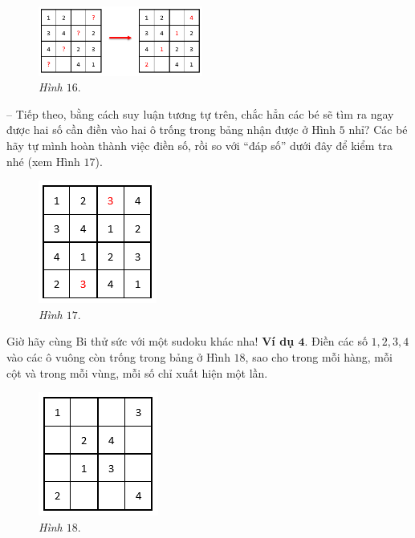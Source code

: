	\begin{multicols}{2}
		\begin{figure}[H]
			\centering
			\vspace*{5pt}
			\captionsetup{labelformat= empty, justification=centering}
			\includegraphics[width=0.48\textwidth]{pic5}
			\caption{\small\textit{Hình $16.$}}
			\vspace*{-10pt}
		\end{figure}
		-- Tiếp theo, bằng cách suy luận tương tự trên, chắc hẳn các bé sẽ tìm ra ngay được hai số cần điền vào hai ô trống trong bảng nhận được ở Hình $5$ nhỉ? Các bé hãy tự mình hoàn thành việc điền số, rồi so với “đáp số” dưới đây để kiểm tra nhé (xem Hình $17$).
		\begin{figure}[H]
			\centering
			\vspace*{-10pt}
			\captionsetup{labelformat= empty, justification=centering}
			\includegraphics[scale=1]{pic6}
			\caption{\small\textit{Hình $17.$}}
			\vspace*{-5pt}
		\end{figure}
	\end{multicols}
	Giờ hãy cùng Bi thử sức với một sudoku  khác nha!
	\vskip 0.1cm
		\textbf{Ví dụ $\pmb{4.}$} Điền các số $1, 2, 3, 4$ vào các ô vuông còn trống trong bảng ở Hình $18$, sao cho trong mỗi hàng, mỗi cột và trong mỗi vùng, mỗi số chỉ xuất hiện một lần.
		\vskip 0.1cm
		\begin{figure}
			\centering
			\vspace*{-35pt}
			\captionsetup{labelformat= empty, justification=centering}
			\includegraphics[scale=0.9]{pic7}
			\caption{\small\textit{Hình $18.$}}
			\vspace*{-20pt}
		\end{figure}
